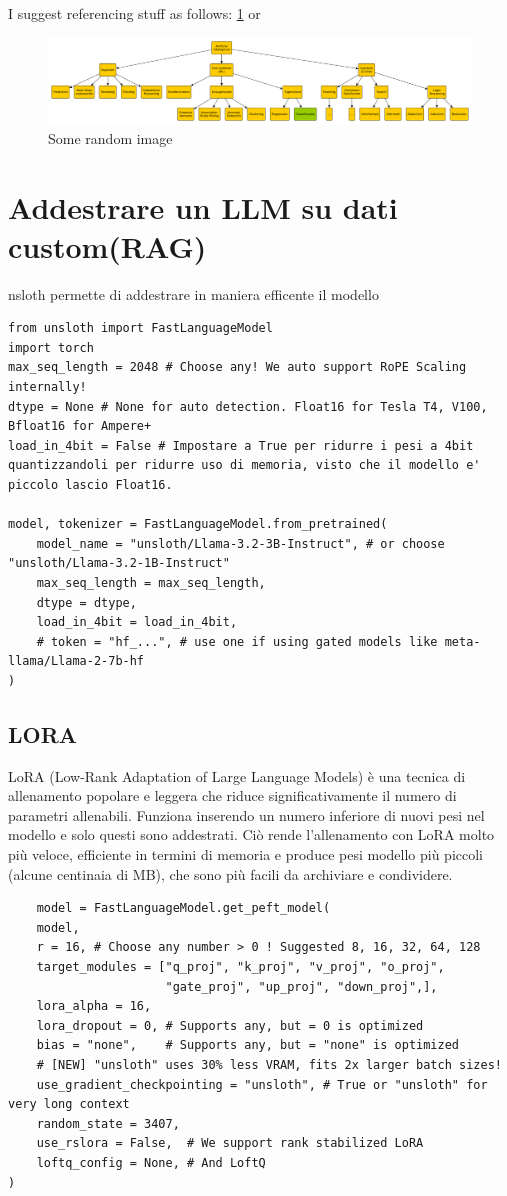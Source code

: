 \documentclass[12pt,a4paper,openright,twoside]{book}
\begin{document}
I suggest referencing stuff as follows: \cref{fig:random-image} or 

\begin{figure}
    \centering
    \includegraphics[width=.8\linewidth]{figures/random-image.pdf}
    \caption{Some random image}
    \label{fig:random-image}
\end{figure}


\chapter{Addestrare un LLM su dati custom(RAG)}
nsloth permette di addestrare in maniera efficente il modello

\begin{lstlisting}
from unsloth import FastLanguageModel
import torch
max_seq_length = 2048 # Choose any! We auto support RoPE Scaling internally!
dtype = None # None for auto detection. Float16 for Tesla T4, V100, Bfloat16 for Ampere+
load_in_4bit = False # Impostare a True per ridurre i pesi a 4bit quantizzandoli per ridurre uso di memoria, visto che il modello e' piccolo lascio Float16. 

model, tokenizer = FastLanguageModel.from_pretrained(
    model_name = "unsloth/Llama-3.2-3B-Instruct", # or choose "unsloth/Llama-3.2-1B-Instruct"
    max_seq_length = max_seq_length,
    dtype = dtype,
    load_in_4bit = load_in_4bit,
    # token = "hf_...", # use one if using gated models like meta-llama/Llama-2-7b-hf
)
\end{lstlisting}

\section{LORA}
LoRA (Low-Rank Adaptation of Large Language Models)
è una tecnica di allenamento popolare e leggera che riduce significativamente il numero di parametri allenabili. Funziona inserendo un numero inferiore di nuovi pesi nel modello e solo questi sono addestrati. Ciò rende l'allenamento con LoRA molto più veloce, efficiente in termini di memoria e produce pesi modello più piccoli (alcune centinaia di MB), che sono più facili da archiviare e condividere.

\begin{lstlisting}
    model = FastLanguageModel.get_peft_model(
    model,
    r = 16, # Choose any number > 0 ! Suggested 8, 16, 32, 64, 128
    target_modules = ["q_proj", "k_proj", "v_proj", "o_proj",
                      "gate_proj", "up_proj", "down_proj",],
    lora_alpha = 16,
    lora_dropout = 0, # Supports any, but = 0 is optimized
    bias = "none",    # Supports any, but = "none" is optimized
    # [NEW] "unsloth" uses 30% less VRAM, fits 2x larger batch sizes!
    use_gradient_checkpointing = "unsloth", # True or "unsloth" for very long context
    random_state = 3407,
    use_rslora = False,  # We support rank stabilized LoRA
    loftq_config = None, # And LoftQ
)
\end{lstlisting}
\end{document}
